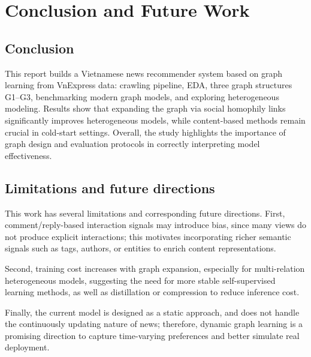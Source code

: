 \documentclass[11pt]{article}
\begin{document}
\section{Conclusion and Future Work}
\label{sec:conclusion}

\subsection{Conclusion}
This report builds a Vietnamese news recommender system based on graph learning from VnExpress data: crawling pipeline, EDA, three graph structures G1--G3, benchmarking modern graph models, and exploring heterogeneous modeling. Results show that expanding the graph via social homophily links significantly improves heterogeneous models, while content-based methods remain crucial in cold-start settings. Overall, the study highlights the importance of graph design and evaluation protocols in correctly interpreting model effectiveness.

\subsection{Limitations and future directions}
This work has several limitations and corresponding future directions.
First, comment/reply-based interaction signals may introduce bias,
since many views do not produce explicit interactions;
this motivates incorporating richer semantic signals such as tags, authors, or entities
to enrich content representations.

Second, training cost increases with graph expansion,
especially for multi-relation heterogeneous models,
suggesting the need for more stable self-supervised learning methods,
as well as distillation or compression to reduce inference cost.

Finally, the current model is designed as a static approach,
and does not handle the continuously updating nature of news;
therefore, dynamic graph learning is a promising direction
to capture time-varying preferences
and better simulate real deployment.


\end{document}
